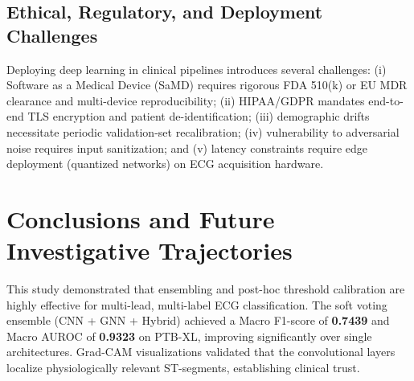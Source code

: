 \documentclass[14pt]{extarticle}
\begin{document}
\subsection{Ethical, Regulatory, and Deployment Challenges}
Deploying deep learning in clinical pipelines introduces several challenges: (i) Software as a Medical Device (SaMD) requires rigorous FDA 510(k) or EU MDR clearance and multi-device reproducibility; (ii) HIPAA/GDPR mandates end-to-end TLS encryption and patient de-identification; (iii) demographic drifts necessitate periodic validation-set recalibration; (iv) vulnerability to adversarial noise requires input sanitization; and (v) latency constraints require edge deployment (quantized networks) on ECG acquisition hardware.

\section{Conclusions and Future Investigative Trajectories}
\label{sec:conclusion}
This study demonstrated that ensembling and post-hoc threshold calibration are highly effective for multi-lead, multi-label ECG classification. The soft voting ensemble (CNN + GNN + Hybrid) achieved a Macro F1-score of \textbf{0.7439} and Macro AUROC of \textbf{0.9323} on PTB-XL, improving significantly over single architectures. Grad-CAM visualizations validated that the convolutional layers localize physiologically relevant ST-segments, establishing clinical trust.
\end{document}
